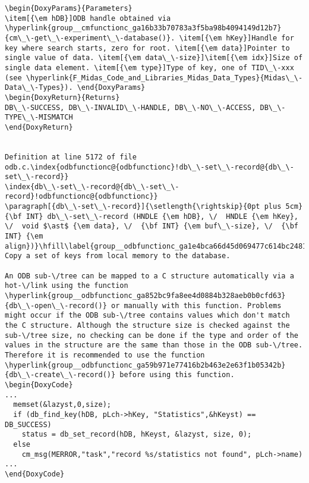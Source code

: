 \begin{DoxyItemize}
\begin{DoxyCode}
\begin{verbatim}
\begin{DoxyParams}{Parameters}
\item[{\em hDB}]ODB handle obtained via \hyperlink{group__cmfunctionc_ga16b33b70783a3f5ba98b4094149d12b7}{cm\_\-get\_\-experiment\_\-database()}. \item[{\em hKey}]Handle for key where search starts, zero for root. \item[{\em data}]Pointer to single value of data. \item[{\em data\_\-size}]\item[{\em idx}]Size of single data element. \item[{\em type}]Type of key, one of TID\_\-xxx (see \hyperlink{F_Midas_Code_and_Libraries_Midas_Data_Types}{Midas\_\-Data\_\-Types}). \end{DoxyParams}
\begin{DoxyReturn}{Returns}
DB\_\-SUCCESS, DB\_\-INVALID\_\-HANDLE, DB\_\-NO\_\-ACCESS, DB\_\-TYPE\_\-MISMATCH 
\end{DoxyReturn}


Definition at line 5172 of file odb.c.\index{odbfunctionc@{odbfunctionc}!db\_\-set\_\-record@{db\_\-set\_\-record}}
\index{db\_\-set\_\-record@{db\_\-set\_\-record}!odbfunctionc@{odbfunctionc}}
\paragraph[{db\_\-set\_\-record}]{\setlength{\rightskip}{0pt plus 5cm}{\bf INT} db\_\-set\_\-record (HNDLE {\em hDB}, \/  HNDLE {\em hKey}, \/  void $\ast$ {\em data}, \/  {\bf INT} {\em buf\_\-size}, \/  {\bf INT} {\em align})}\hfill\label{group__odbfunctionc_ga1e4bca66d45d069477c614bc2481d89f}
Copy a set of keys from local memory to the database.

An ODB sub-\/tree can be mapped to a C structure automatically via a hot-\/link using the function \hyperlink{group__odbfunctionc_ga852bc9fa8ee4d0884b328aeb0b0cfd63}{db\_\-open\_\-record()} or manually with this function. Problems might occur if the ODB sub-\/tree contains values which don't match the C structure. Although the structure size is checked against the sub-\/tree size, no checking can be done if the type and order of the values in the structure are the same than those in the ODB sub-\/tree. Therefore it is recommended to use the function \hyperlink{group__odbfunctionc_ga59b971e77416b2b463e2e63f1b05342b}{db\_\-create\_\-record()} before using this function. 
\begin{DoxyCode}
...
  memset(&lazyst,0,size);
  if (db_find_key(hDB, pLch->hKey, "Statistics",&hKeyst) == DB_SUCCESS)
    status = db_set_record(hDB, hKeyst, &lazyst, size, 0);
  else
    cm_msg(MERROR,"task","record %s/statistics not found", pLch->name)
...
\end{DoxyCode}
 

\end{verbatim}
\end{DoxyCode}
\end{DoxyItemize}
